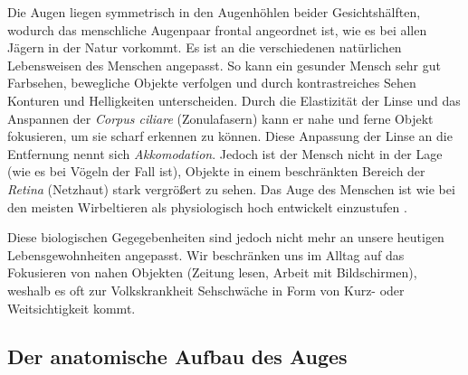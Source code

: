\documentclass[12pt,a4paper]{article}
\newcommand{\fwex}[1]{\textit{#1}}
\newcommand{\Se}[1]{S. #1}
\begin{document}
Die Augen liegen symmetrisch in den Augenhöhlen beider Gesichtshälften,
wodurch das menschliche Augenpaar frontal angeordnet ist, wie es bei allen
Jägern in der Natur vorkommt. Es ist an die verschiedenen natürlichen
Lebensweisen des Menschen angepasst. So kann ein gesunder Mensch sehr gut
Farbsehen, bewegliche Objekte verfolgen und durch kontrastreiches Sehen
Konturen und Helligkeiten unterscheiden. Durch die Elastizität der Linse
und das Anspannen der \fwex{Corpus ciliare} (Zonulafasern) kann er nahe und
ferne Objekt fokusieren, um sie scharf erkennen zu können. Diese Anpassung
der Linse an die Entfernung nennt sich \fwex{Akkomodation}. Jedoch ist der
Mensch nicht in der Lage (wie es bei Vögeln der Fall ist), Objekte in
einem beschränkten Bereich der \fwex{Retina} (Netzhaut) stark vergrößert
zu sehen. Das Auge des Menschen ist wie bei den meisten Wirbeltieren als
physiologisch hoch entwickelt einzustufen \cite[\Se{58}]{anatomie}.

Diese biologischen Gegegebenheiten sind jedoch nicht mehr an unsere
heutigen Lebensgewohnheiten angepasst. Wir beschränken uns im Alltag auf
das Fokusieren von nahen Objekten (Zeitung lesen, Arbeit mit Bildschirmen),
weshalb es oft zur Volkskrankheit Sehschwäche in Form von Kurz- oder
Weitsichtigkeit kommt.

\subsection{Der anatomische Aufbau des Auges}
\label{sec:ana}
\end{document}
